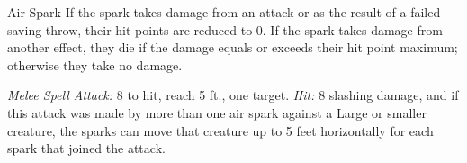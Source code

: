 \documentclass[10pt,a4paper,twoside,bg=print,twocolumn,openany,nodeprecatedcode]{dndbook}
\begin{document}
\begin{DndMonster}[float=t]{Air Spark}
\DndMonsterBasics[
armor-class = {13},
hit-points = {\DndDice{22}},
speed = {20 ft., fly 50 ft. \textit{(hover)}}
]
\DndMonsterAbilityScores[
 str = 8,
 dex = 16,
 con = 10,
 int = 9,
 wis = 11,
 cha = 12
]
\DndMonsterDetails[
skills = {Perception +5},
senses = {darkvision 60 ft., passive perception 15},
languages = {Auran, Common},
challenge = 15,
]
If the spark takes damage from an attack or as the result of a failed saving throw, their hit points are reduced to 0. If the spark takes damage from another effect, they die if the damage equals or exceeds their hit point maximum; otherwise they take no damage.

\textsl{Melee Spell Attack:} 8 to hit, reach 5 ft., one target. \textsl{Hit:} 8 slashing damage, and if this attack was made by more than one air spark against a Large or smaller creature, the sparks can move that creature up to 5 feet horizontally for each spark that joined the attack.

\end{DndMonster}
\end{document}
